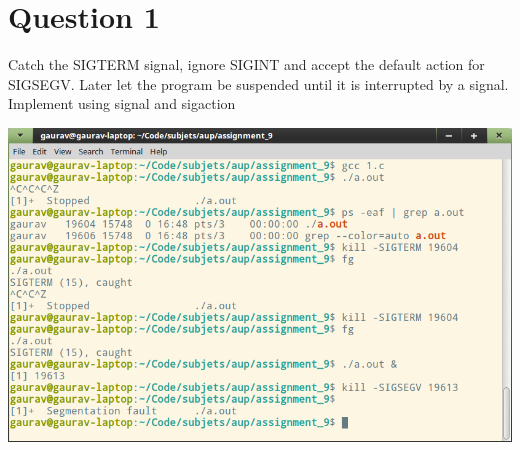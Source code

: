\documentclass[main.tex]{subfiles}
\begin{document}
\section{Question 1}
Catch the SIGTERM signal, ignore SIGINT and accept the default action for
SIGSEGV. Later let the program be suspended until it is interrupted by a signal.
Implement using signal and sigaction


\includegraphics[width=\textwidth]{figures/1_output.png}
\end{document}
